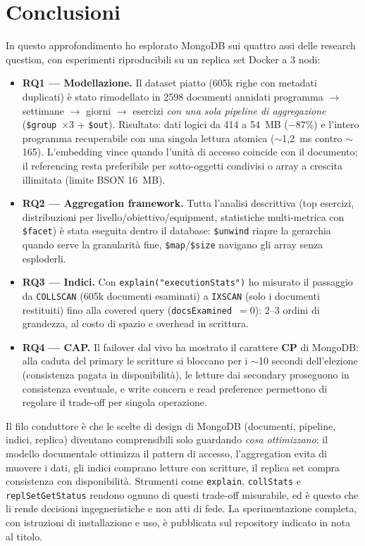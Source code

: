 \documentclass{article}
\begin{document}
\section{Conclusioni}
\label{sec:conclusioni}

In questo approfondimento ho esplorato MongoDB sui quattro assi delle research
question, con esperimenti riproducibili su un replica set Docker a 3 nodi:
\begin{itemize}
    \item \textbf{RQ1 --- Modellazione.} Il dataset piatto (605k righe con
    metadati duplicati) è stato rimodellato in \num{2598} documenti annidati
    programma $\rightarrow$ settimane $\rightarrow$ giorni $\rightarrow$ esercizi
    \emph{con una sola pipeline di aggregazione} (\texttt{\$group}~$\times$3 +
    \texttt{\$out}). Risultato: dati logici da 414 a 54~MB ($-87\%$) e l'intero
    programma recuperabile con una singola lettura atomica ($\sim$1{,}2~ms contro
    $\sim$165). L'embedding vince quando l'unità di accesso coincide con il
    documento; il referencing resta preferibile per sotto-oggetti condivisi o
    array a crescita illimitata (limite BSON 16~MB).
    \item \textbf{RQ2 --- Aggregation framework.} Tutta l'analisi descrittiva
    (top esercizi, distribuzioni per livello/obiettivo/equipment, statistiche
    multi-metrica con \texttt{\$facet}) è stata eseguita dentro il database:
    \texttt{\$unwind} riapre la gerarchia quando serve la granularità fine,
    \texttt{\$map}/\texttt{\$size} navigano gli array senza esploderli.
    \item \textbf{RQ3 --- Indici.} Con \texttt{explain("executionStats")} ho
    misurato il passaggio da \texttt{COLLSCAN} (605k documenti esaminati) a
    \texttt{IXSCAN} (solo i documenti restituiti) fino alla covered query
    (\texttt{docsExamined}~$=0$): 2--3 ordini di grandezza, al costo di spazio e
    overhead in scrittura.
    \item \textbf{RQ4 --- CAP.} Il failover dal vivo ha mostrato il carattere
    \textbf{CP} di MongoDB: alla caduta del primary le scritture si bloccano per i
    $\sim$10 secondi dell'elezione (consistenza pagata in disponibilità), le
    letture dai secondary proseguono in consistenza eventuale, e write concern e
    read preference permettono di regolare il trade-off per singola operazione.
\end{itemize}

Il filo conduttore è che le scelte di design di MongoDB (documenti, pipeline,
indici, replica) diventano comprensibili solo guardando \emph{cosa ottimizzano}:
il modello documentale ottimizza il pattern di accesso, l'aggregation evita di
muovere i dati, gli indici comprano letture con scritture, il replica set compra
consistenza con disponibilità. Strumenti come \texttt{explain},
\texttt{collStats} e \texttt{replSetGetStatus} rendono ognuno di questi trade-off
misurabile, ed è questo che li rende decisioni ingegneristiche e non atti di fede.
La sperimentazione completa, con istruzioni di installazione e uso, è pubblicata
sul repository indicato in nota al titolo.

\newpage
{}


\end{document}
